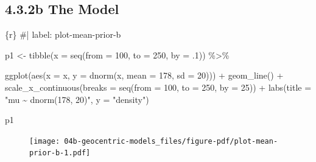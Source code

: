 \documentclass[
  letterpaper,
  DIV=11,
  numbers=noendperiod]{scrreprt}
\newenvironment{Shaded}{\begin{snugshade}}{\end{snugshade}}
\newcommand{\AttributeTok}[1]{\textcolor[rgb]{0.40,0.45,0.13}{#1}}
\newcommand{\CommentTok}[1]{\textcolor[rgb]{0.37,0.37,0.37}{#1}}
\newcommand{\DecValTok}[1]{\textcolor[rgb]{0.68,0.00,0.00}{#1}}
\newcommand{\FunctionTok}[1]{\textcolor[rgb]{0.28,0.35,0.67}{#1}}
\newcommand{\InformationTok}[1]{\textcolor[rgb]{0.37,0.37,0.37}{#1}}
\newcommand{\NormalTok}[1]{\textcolor[rgb]{0.00,0.23,0.31}{#1}}
\newcommand{\OtherTok}[1]{\textcolor[rgb]{0.00,0.23,0.31}{#1}}
\newcommand{\SpecialCharTok}[1]{\textcolor[rgb]{0.37,0.37,0.37}{#1}}
\newcommand{\StringTok}[1]{\textcolor[rgb]{0.13,0.47,0.30}{#1}}
\begin{document}
\hypertarget{b-the-model}{%
\subsection{4.3.2b The Model}\label{b-the-model}}

\begin{Shaded}
\begin{Highlighting}[]
\InformationTok{\textasciigrave{}\textasciigrave{}\textasciigrave{}\{r\}}
\CommentTok{\#| label: plot{-}mean{-}prior{-}b}

\NormalTok{p1 }\OtherTok{\textless{}{-}}
  \FunctionTok{tibble}\NormalTok{(}\AttributeTok{x =} \FunctionTok{seq}\NormalTok{(}\AttributeTok{from =} \DecValTok{100}\NormalTok{, }\AttributeTok{to =} \DecValTok{250}\NormalTok{, }\AttributeTok{by =}\NormalTok{ .}\DecValTok{1}\NormalTok{)) }\SpecialCharTok{\%\textgreater{}\%} 
  
  \FunctionTok{ggplot}\NormalTok{(}\FunctionTok{aes}\NormalTok{(}\AttributeTok{x =}\NormalTok{ x, }\AttributeTok{y =} \FunctionTok{dnorm}\NormalTok{(x, }\AttributeTok{mean =} \DecValTok{178}\NormalTok{, }\AttributeTok{sd =} \DecValTok{20}\NormalTok{))) }\SpecialCharTok{+}
  \FunctionTok{geom\_line}\NormalTok{() }\SpecialCharTok{+}
  \FunctionTok{scale\_x\_continuous}\NormalTok{(}\AttributeTok{breaks =} \FunctionTok{seq}\NormalTok{(}\AttributeTok{from =} \DecValTok{100}\NormalTok{, }\AttributeTok{to =} \DecValTok{250}\NormalTok{, }\AttributeTok{by =} \DecValTok{25}\NormalTok{)) }\SpecialCharTok{+}
  \FunctionTok{labs}\NormalTok{(}\AttributeTok{title =} \StringTok{"mu \textasciitilde{} dnorm(178, 20)"}\NormalTok{,}
       \AttributeTok{y =} \StringTok{"density"}\NormalTok{)}

\NormalTok{p1}
\InformationTok{\textasciigrave{}\textasciigrave{}\textasciigrave{}}
\end{Highlighting}
\end{Shaded}

\begin{figure}[H]

{\centering \texttt{[image: 04b-geocentric-models\_files/figure-pdf/plot-mean-prior-b-1.pdf]}

}

\end{figure}
\end{document}

